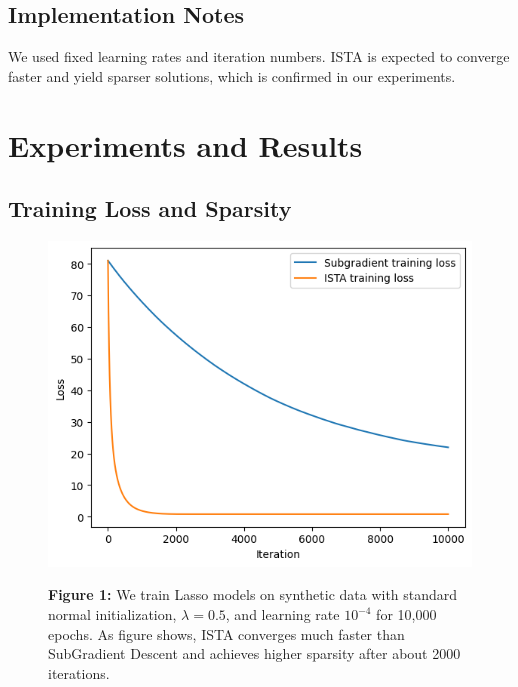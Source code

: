 \documentclass[11pt]{article}
\begin{document}
\subsection*{Implementation Notes}

We used fixed learning rates and iteration numbers. ISTA is expected to converge faster and yield sparser solutions, which is confirmed in our experiments.

\section{Experiments and Results}


\subsection{Training Loss and Sparsity}
\begin{figure}[H]
    \centering
    \begin{minipage}{0.3\textwidth}
        \includegraphics[width=\linewidth]{figures/fig1.png}
    \end{minipage}
    \hfill
    \begin{minipage}{0.5\textwidth}
        \small
        \textbf{Figure 1:} We train Lasso models  on synthetic data with standard normal initialization, \( \lambda = 0.5 \), and learning rate \( 10^{-4} \) for 10,000 epochs. As figure shows,
        ISTA converges much faster than SubGradient Descent and achieves higher sparsity after about 2000 iterations.
    \end{minipage}
\end{figure}
\end{document}
